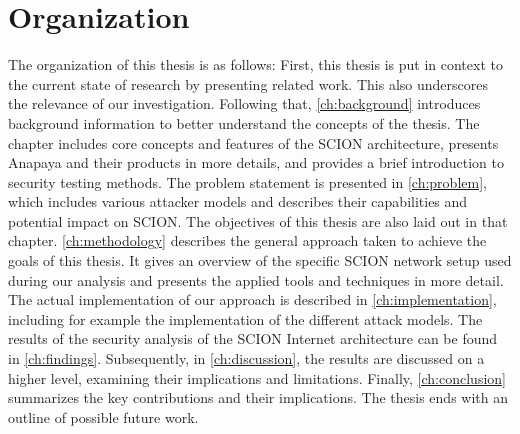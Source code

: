 

\section{Organization}
\label{sec:intro:organization}

The organization of this thesis is as follows:
First, this thesis is put in context to the current state of research by presenting related work.
This also underscores the relevance of our investigation.
Following that, \cref{ch:background} introduces background information to better understand the concepts of the thesis.
The chapter includes core concepts and features of the SCION architecture, presents Anapaya and their products in more details, and provides a brief introduction to security testing methods.
The problem statement is presented in \cref{ch:problem}, which includes various attacker models and describes their capabilities and potential impact on SCION.
The objectives of this thesis are also laid out in that chapter.
\cref{ch:methodology} describes the general approach taken to achieve the goals of this thesis.
It gives an overview of the specific SCION network setup used during our analysis and presents the applied tools and techniques in more detail.
The actual implementation of our approach is described in \cref{ch:implementation}, including for example the implementation of the different attack models.
The results of the security analysis of the SCION Internet architecture can be found in \cref{ch:findings}.
Subsequently, in \cref{ch:discussion}, the results are discussed on a higher level, examining their implications and limitations.
Finally, \cref{ch:conclusion} summarizes the key contributions and their implications.
The thesis ends with an outline of possible future work.

